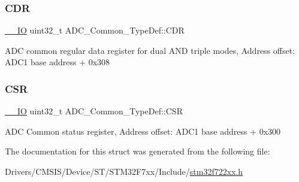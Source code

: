 \subsubsection{\texorpdfstring{CDR}{CDR}}
{\footnotesize\ttfamily \mbox{\hyperlink{core__sc300_8h_aec43007d9998a0a0e01faede4133d6be}{\+\_\+\+\_\+\+IO}} uint32\+\_\+t A\+D\+C\+\_\+\+Common\+\_\+\+Type\+Def\+::\+C\+DR}

A\+DC common regular data register for dual A\+ND triple modes, Address offset\+: A\+D\+C1 base address + 0x308 \mbox{\label{struct_a_d_c___common___type_def_ac38e24f600f9e134a54a0c43b976a4f4}} 
\subsubsection{\texorpdfstring{CSR}{CSR}}
{\footnotesize\ttfamily \mbox{\hyperlink{core__sc300_8h_aec43007d9998a0a0e01faede4133d6be}{\+\_\+\+\_\+\+IO}} uint32\+\_\+t A\+D\+C\+\_\+\+Common\+\_\+\+Type\+Def\+::\+C\+SR}

A\+DC Common status register, Address offset\+: A\+D\+C1 base address + 0x300 

The documentation for this struct was generated from the following file\+:\begin{DoxyCompactItemize}
\item 
Drivers/\+C\+M\+S\+I\+S/\+Device/\+S\+T/\+S\+T\+M32\+F7xx/\+Include/\mbox{\hyperlink{stm32f722xx_8h}{stm32f722xx.\+h}}\end{DoxyCompactItemize}
